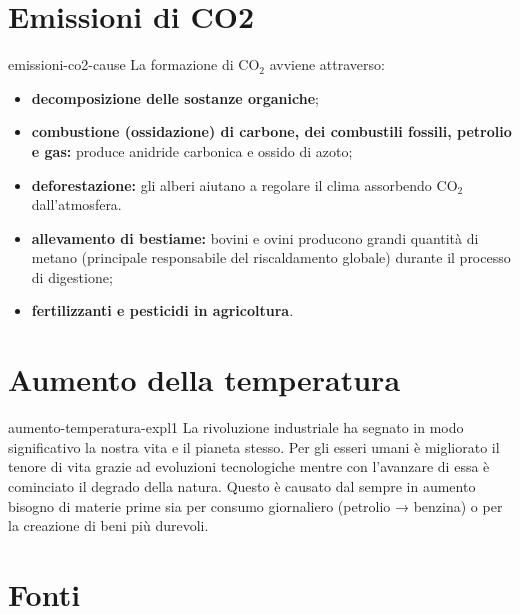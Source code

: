 \documentclass[preview]{standalone}
\begin{document}
\section{Emissioni di CO2}

\begin{snippet}{emissioni-co2-cause}
    La formazione di CO\({}_2\) avviene attraverso:
    \begin{itemize}
        \item \textbf{decomposizione delle sostanze organiche};
        \item \textbf{combustione (ossidazione) di carbone, dei combustili fossili, petrolio e
        gas:} produce anidride carbonica e ossido di azoto;
        \item \textbf{deforestazione:} gli alberi aiutano a regolare il clima
        assorbendo CO\({}_2\) dall'atmosfera.
        \item \textbf{allevamento di bestiame:} bovini e ovini producono grandi quantità
        di metano (principale responsabile del riscaldamento globale) durante il processo di
        digestione;
        \item \textbf{fertilizzanti e pesticidi in agricoltura}.
    \end{itemize}
\end{snippet}

\section{Aumento della temperatura}

\begin{snippet}{aumento-temperatura-expl1}
    La rivoluzione industriale ha segnato in
    modo significativo la nostra vita e il
    pianeta stesso. Per gli esseri umani è
    migliorato il tenore di vita grazie ad
    evoluzioni tecnologiche mentre con l'avanzare di essa è cominciato il
    degrado della
    natura. Questo è causato dal sempre in aumento bisogno di materie prime sia per
    consumo giornaliero (petrolio → benzina) o per la creazione di beni più durevoli.
\end{snippet}


\section{Fonti}
\end{document}
